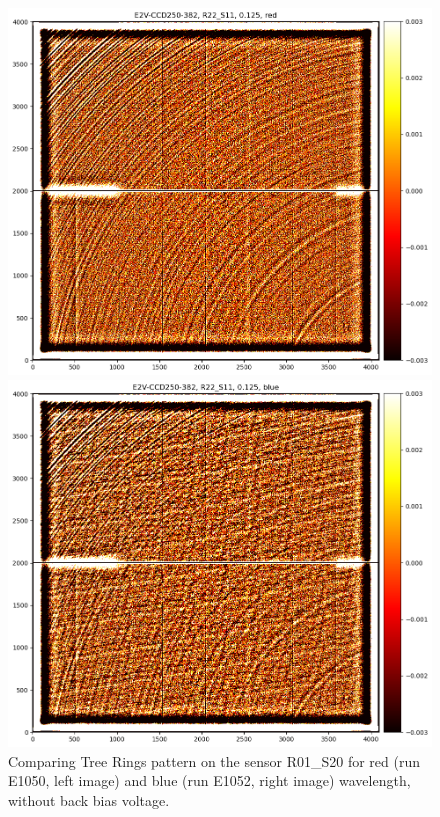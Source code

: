 \begin{figure}[h]
\centering
\begin{minipage}[b]{0.45\textwidth}
\centering
\includegraphics[width=\textwidth]{figures/R22_S11_red.png}
\end{minipage}
\begin{minipage}[b]{0.45\textwidth}
\centering
\includegraphics[width=\textwidth]{figures/R22_S11_blue.png}
\end{minipage}
\caption{Comparing Tree Rings pattern on the sensor R01\_S20 for red (run E1050, left image) and blue (run E1052, right image) wavelength, without back bias voltage.}
\label{fig:tree_ring_wavelength_dep}
\end{figure}

